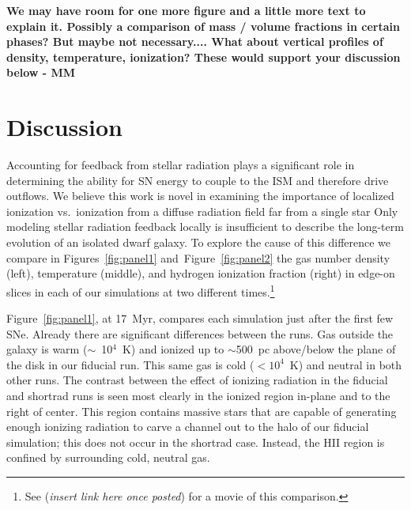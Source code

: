 \documentclass[twocolumn]{aastex62}
\begin{document}
\textbf{We may have room for one more figure and a little more text to explain it. Possibly a comparison of mass / volume fractions in certain phases? But maybe not necessary.... 
%
What about vertical profiles of density, temperature, ionization?  These would support your discussion below - MM
}

\section{Discussion} \label{sec:discussion}
Accounting for feedback from stellar radiation plays a significant role in determining the ability for SN energy to couple to the ISM and therefore drive outflows. 
     We believe this work is novel in examining the
importance of localized ionization vs.\ ionization from a diffuse radiation field far from a single star
    Only modeling 
stellar radiation feedback locally 
is insufficient to describe the long-term evolution of an isolated dwarf galaxy. To explore the cause of this difference we 
compare in Figures~\ref{fig:panel1} and~Figure~\ref{fig:panel2} 
the gas number density (left), temperature (middle), and hydrogen ionization fraction (right) in edge-on slices in each of our simulations at two different times.\footnote{See ({\it insert link here once posted}) for a movie of this comparison.} 

Figure~\ref{fig:panel1}, at 17~Myr, compares each simulation just after the first few SNe. Already there are significant differences between the runs. Gas outside the galaxy is warm ($\sim$~10$^{4}$~K) and ionized up to $\sim$500~pc above/below the plane of the disk in our fiducial run. This same gas is cold ($<10^4$~K) and neutral in both other runs. The contrast between the effect of ionizing radiation in the fiducial and shortrad runs is seen most clearly in the ionized region in-plane and to the right of center. This region contains massive stars that are capable of generating enough ionizing radiation to carve a channel out to the halo of our fiducial simulation; this does not occur in the shortrad case. Instead, the HII region is confined by surrounding cold, neutral gas. 
\end{document}
